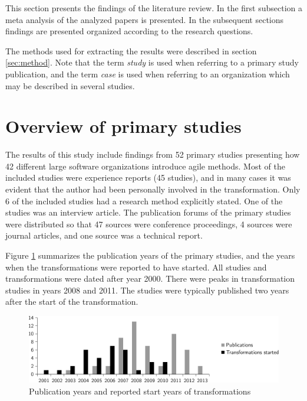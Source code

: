 This section presents the findings of the literature review. In the first
subsection a meta analysis of the analyzed papers is presented. In the
subsequent sections findings are presented organized according to the research
questions.

The methods used for extracting the results were described in section
\ref{sec:method}. Note that the term \emph{study} is used when referring to a
primary study publication, and the term \emph{case} is used when referring to an
organization which may be described in several studies.

\section{Overview of primary studies}

The results of this study include findings from 52 primary studies presenting
how 42 different large software organizations introduce agile methods. Most of
the included studies were experience reports (45 studies), and in many cases it
was evident that the author had been personally involved in the transformation.
Only 6 of the included studies had a research method explicitly stated. One of
the studies was an interview article. The publication forums of the primary
studies were distributed so that 47 sources were conference proceedings, 4
sources were journal articles, and one source was a technical report.

Figure \ref{fig:transformation_time} summarizes the publication years of the
primary studies, and the years when the transformations were reported to have
started. All studies and transformations were dated after year 2000. There were
peaks in transformation studies in years 2008 and 2011. The studies were
typically published two years after the start of the transformation.

\begin{figure}[b]
  \begin{center}
    \includegraphics[width=1\textwidth]{graphics/transformation_time.pdf}
    \caption{Publication years and reported start years of transformations}
    \label{fig:transformation_time}
  \end{center}
\end{figure}

